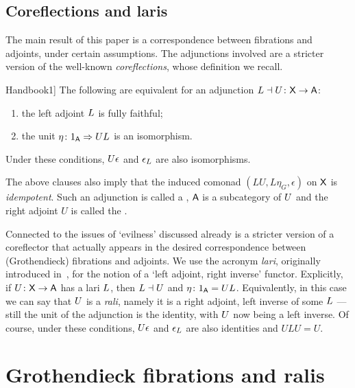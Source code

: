 \documentclass{amsart}
\begin{document}
\subsection*{Coreflections and laris}

The main result of this paper is a correspondence between fibrations and adjoints, under certain assumptions. The adjunctions involved are a stricter version of the well-known \emph{coreflections}, whose definition we recall. %

\begin{prop}[\cite[Prop.~3.4.1]{Handbook1}]\label{prop:coreflection}
The following are equivalent for an adjunction $L\dashv U\colon\mathsf{X}\to\mathsf{A}$:
 \begin{enumerate}
  \item the left adjoint $L$ is fully faithful;
  \item the unit $\eta\colon1_{\mathsf{A}}\Rightarrow UL$ is an isomorphism.
 \end{enumerate}
Under these conditions, $U\epsilon$ and $\epsilon_L$ are also isomorphisms.
\end{prop}

The above clauses also imply that the induced comonad $(LU,L\eta_G,\epsilon)$ on $\mathsf{X}$ is \emph{idempotent}. Such an adjunction is called a , $\mathsf{A}$ is a  subcategory of $U$ and the right adjoint $U$ is called the .

Connected to the issues of `evilness' discussed already is a stricter version of a coreflector that actually appears in the desired correspondence between (Gro\-the\-ndi\-eck) fibrations and adjoints.
We use the acronym \emph{lari}, originally introduced in~\cite{Grayfibredandcofibred}, for the notion of a `left adjoint, right inverse' functor. Explicitly, if $U\colon\mathsf{X}\to\mathsf{A}$ has a lari $L$, then $L\dashv U$ and $\eta\colon1_{\mathsf{A}}=UL$. Equivalently, in this case we can say that $U$ is a \emph{rali}, namely it is a right adjoint, left inverse of some $L$ --- still the unit of the adjunction is the identity, with $U$ now being a left inverse. Of course, under these conditions, $U\epsilon$ and $\epsilon_L$ are also identities and $ULU=U$.


\section{Grothendieck fibrations and ralis}
\label{sec:groth-fibs-ralis}
\end{document}
